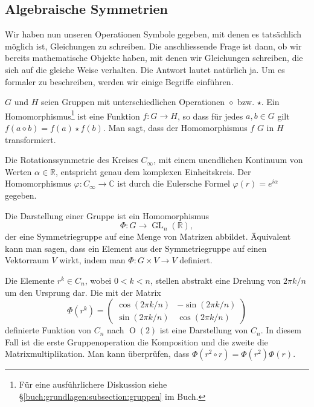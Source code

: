 \subsection{Algebraische Symmetrien}
Wir haben nun unseren Operationen Symbole gegeben, mit denen es tatsächlich möglich ist, Gleichungen zu schreiben.
Die anschliessende Frage ist dann, ob wir bereits mathematische Objekte haben, mit denen wir Gleichungen schreiben, die sich auf die gleiche Weise verhalten.
Die Antwort lautet natürlich ja.
Um es formaler zu beschreiben, werden wir einige Begriffe einführen.
\begin{definition}[Gruppenhomomorphismus]
%
  \(G\) und \(H\) seien  Gruppen mit unterschiedlichen Operationen \(\diamond\) bzw.
  \(\star\).
  Ein Homomorphismus\footnote{ Für eine ausführlichere Diskussion siehe \S\ref{buch:grundlagen:subsection:gruppen} im Buch.} ist eine Funktion \(f: G \to H\), so dass für jedes \(a, b \in G\) gilt \(f(a\diamond b) = f(a) \star f(b)\).
%
  Man sagt, dass der Homomorphismus \(f\) \(G\) in \(H\) transformiert.
\end{definition}
\begin{beispiel}
  Die Rotationssymmetrie des Kreises \(C_\infty\), mit einem unendlichen Kontinuum von Werten \(\alpha \in \mathbb{R}\), entspricht genau dem komplexen Einheitskreis.
%
  Der Homomorphismus \(\varphi: C_\infty \to \mathbb{C}\) ist durch die Eulersche Formel \(\varphi(r) = e^{i\alpha}\) gegeben.
\end{beispiel}

\begin{definition}
  Die Darstellung einer Gruppe ist ein Homomorphismus
  \[
    \Phi: G \to \operatorname{GL}_n(\mathbb{R}),
  \]
  der eine Symmetriegruppe auf eine Menge von Matrizen abbildet.
  Äquivalent kann man sagen, dass ein Element aus der Symmetriegruppe auf einen Vektorraum \(V\) wirkt, indem man \(\Phi : G \times V \to V\) definiert.
\end{definition}
\begin{beispiel}
  Die Elemente \(r^k \in C_n\), wobei \(0 < k < n\), stellen abstrakt eine Drehung von \(2\pi k/n\) um den Ursprung dar.
  Die mit der Matrix 
  \[
    \Phi(r^k) = \begin{pmatrix}
      \cos(2\pi k/n) & -\sin(2\pi k/n) \\
      \sin(2\pi k/n) &  \cos(2\pi k/n)
    \end{pmatrix}
  \]
  definierte Funktion von \(C_n\) nach \(\operatorname{O}(2)\) ist eine Darstellung von \(C_n\).
  In diesem Fall ist die erste Gruppenoperation die Komposition und die zweite die Matrixmultiplikation.
  Man kann überprüfen, dass \(\Phi(r^2 \circ r) = \Phi(r^2)\Phi(r)\).
\end{beispiel}
